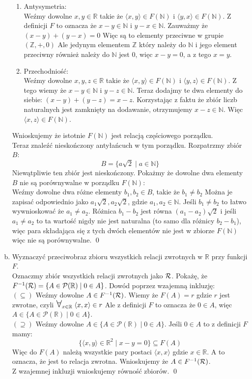 \documentclass[10pt]{article}
\newcommand{\R}{\mathbb{R}}
\newcommand{\N}{\mathbb{N}}
\newcommand{\Z}{\mathbb{Z}}
\newcommand{\Pows}{\mathcal{P}}
\newcommand{\Forall}{{\Large\mbox{$\forall$}}}
\begin{document}
\begin{enumerate}[a)]
\begin{enumerate}[1)]
        \item Antysymetria: \\[5pt]
        Weźmy dowolne $x, y \in \R$ takie że $\langle x, y \rangle \in F(\N)$ i $\langle y, x \rangle \in F(\N)$. Z definicji $F$ to oznacza że $x - y \in \N$ i $y - x \in \N$. Zauważmy że $(x - y) + (y - x) = 0$ Więc są to elementy przeciwne w grupie $(\Z, +, 0)$ Ale jedynym elementem $\Z$ który należy do $\N$ i jego element przeciwny również należy do $\N$ jest $0$, więc $x - y = 0$, a z tego $x = y$.

        \item Przechodniość: \\[5pt]
        Weźmy dowolne $x, y, z \in \R$ takie że $\langle x, y \rangle \in F(\N)$ i $\langle y, z \rangle \in F(\N)$. Z tego wiemy że $x - y \in \N$ i $y - z \in \N$. Teraz dodajmy te dwa elementy do siebie: $(x - y) + (y - z) = x - z$. Korzystając z faktu że zbiór liczb naturalnych jest zamknięty na dodawanie, otrzymujemy $x - z \in \N$. Więc $\langle x, z \rangle \in F(\N)$.
    \end{enumerate}
    Wnioskujemy że istotnie $F(\N)$ jest relacją częściowego porządku. \\[10pt]
    Teraz znaleźć nieskończony antyłańcuch w tym porządku. Rozpatrzmy zbiór $B$:
    $$B = \{a \sqrt{2} \mid a \in \N\}$$
    Niewątpliwie ten zbiór jest nieskończony. Pokażmy że dowolne dwa elementy $B$ nie są porównywalne w porządku $F(\N)$: \\[5pt]
    Weźmy dowolne dwa różne elementy $b_1, b_2 \in B$, takie że $b_1 \neq b_2$ Można je zapisać odpowiednio jako $a_1 \sqrt{2}, a_2 \sqrt{2}$, gdzie $a_1, a_2 \in \N$. Jeśli $b_1 \neq b_2$ to łatwo wywnioskować że $a_1 \neq a_2$. Różnica $b_1 - b_2$ jest równa $(a_1 - a_2) \sqrt{2}$ i jeśli $a_1 \neq a_2$ to ta wartość nigdy nie jest naturalna (to samo dla różnicy $b_2 - b_1$), więc para składająca się z tych dwóch elementów nie jest w zbiorze $F(\N)$ więc nie są porównywalne. \qed

    \item Wyznaczyć przeciwobraz zbioru wszystkich relacji zwrotnych w $\R$ przy funkcji $F$. \\[10pt]
    Oznaczmy zbiór wszystkich relacji zwrotnych jako $\mathcal{R}$. Pokażę, że $F^{-1}(\Rel) = \{A \in \Pows(\R) \mid 0 \in A\}$. Dowód poprzez wzajemną inkluzję: \\[5pt]
    $(\subseteq)$ Weźmy dowolne $A \in F^{-1}(\mathcal{R})$. Wiemy że $F(A) = r$ gdzie $r$ jest zwrotne, czyli $\Forall_{x \in \R} \; \langle x, x \rangle \in r$ Ale z definicji $F$ to oznacza że $0 \in A$, więc $A \in \{A \in \Pows(\R) \mid 0 \in A\}$. \\[5pt]
    $(\supseteq)$ Weźmy dowolne $A \in \{A \in \Pows(\R) \mid 0 \in A\}$. Jeśli $0 \in A$ to z definicji $F$ mamy:
    $$\{\langle x, y \rangle \in \R^2 \mid x - y = 0\} \subseteq F(A)$$
    Więc do $F(A)$ należą wszystkie pary postaci $\langle x, x \rangle$ gdzie $x \in \R$. A to oznacza, że jest to relacja zwrotna. Wnioskujemy że $A \in F^{-1}(\mathcal{R})$. \\[5pt]
    Z wzajemnej inkluzji wnioskujemy równość zbiorów. \qed


\end{enumerate}
\end{document}
